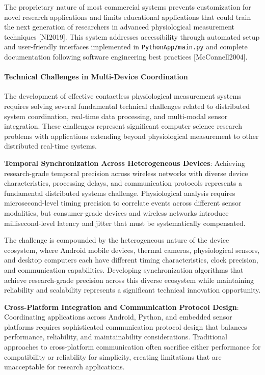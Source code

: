 \documentclass[11pt,a4paper]{article}
\begin{document}
The proprietary nature of most commercial systems prevents customization for novel
research applications and limits
educational applications that could train the next generation of researchers in
advanced physiological measurement
techniques [NI2019].  This system addresses accessibility through automated setup and
user-friendly interfaces
implemented in \texttt{PythonApp/main.py} and complete documentation following
software engineering best
practices [McConnell2004].

\paragraph{Technical Challenges in Multi-Device Coordination}

The development of effective contactless physiological measurement systems requires
solving several fundamental
technical challenges related to distributed system coordination, real-time data
processing, and multi-modal sensor
integration.  These challenges represent significant computer science research
problems with applications extending
beyond physiological measurement to other distributed real-time systems.

\textbf{Temporal Synchronization Across Heterogeneous Devices}: Achieving research-grade temporal precision across wireless
networks with diverse device characteristics, processing delays, and communication
protocols represents a fundamental
distributed systems challenge.  Physiological analysis requires microsecond-level
timing precision to correlate events
across different sensor modalities, but consumer-grade devices and wireless networks
introduce millisecond-level latency
and jitter that must be systematically compensated.

The challenge is compounded by the heterogeneous nature of the device ecosystem,
where Android mobile devices, thermal
cameras, physiological sensors, and desktop computers each have different timing
characteristics, clock precision, and
communication capabilities.  Developing synchronization algorithms that achieve
research-grade precision across this
diverse ecosystem while maintaining reliability and scalability represents a
significant technical innovation
opportunity.

\textbf{Cross-Platform Integration and Communication Protocol Design}: Coordinating applications across Android, Python, and
embedded sensor platforms requires sophisticated communication protocol design that
balances performance, reliability,
and maintainability considerations.  Traditional approaches to cross-platform
communication often sacrifice either
performance for compatibility or reliability for simplicity, creating limitations
that are unacceptable for research
applications.
\end{document}
